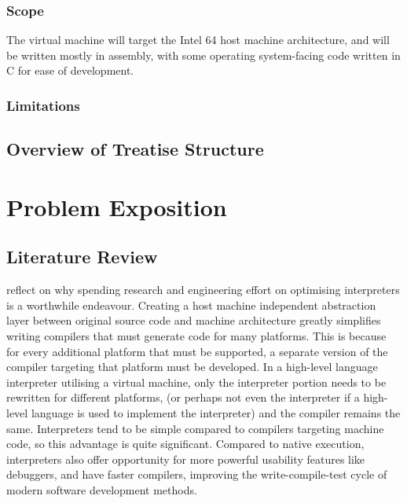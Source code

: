 		\subsection{Scope}
			The virtual machine will target the Intel 64 host machine architecture, and will be written mostly in assembly, with some operating system-facing code written in C for ease of development. 
		
		\subsection{Limitations}
			
				
	\section{Overview of Treatise Structure}

\chapter{Problem Exposition}
	\section{Literature Review}
		\cite{structureinterpreters} reflect on why spending research and engineering effort on optimising interpreters is a worthwhile endeavour. Creating a host machine independent abstraction layer between original source code and machine architecture greatly simplifies writing compilers that must generate code for many platforms. This is because for every additional platform that must be supported, a separate version of the compiler targeting that platform must be developed. In a high-level language interpreter utilising a virtual machine, only the interpreter portion needs to be rewritten for different platforms, (or perhaps not even the interpreter if a high-level language is used to implement the interpreter) and the compiler remains the same. Interpreters tend to be simple compared to compilers targeting machine code, so this advantage is quite significant. Compared to native execution, interpreters also offer opportunity for more powerful usability features like debuggers, and have faster compilers, improving the write-compile-test cycle of modern software development methods.
		
